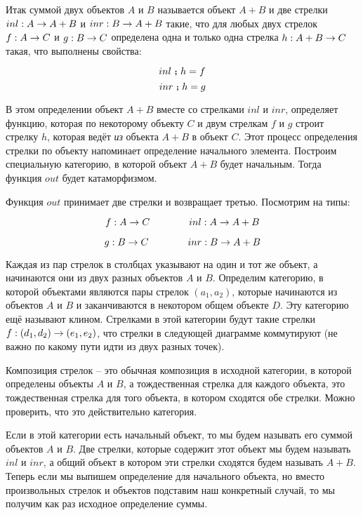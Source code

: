 \begin{centering}



\end{centering}

Итак суммой двух объектов $A$ и $B$ называется объект $A+B$ и две
стрелки $inl : A \rightarrow A+B$ и $inr : B \rightarrow A+B$ такие, что для любых двух
стрелок $f : A \rightarrow C$ и $g : B \rightarrow C$ определена одна и только одна
стрелка $h : A+B \rightarrow C$ такая, что выполнены свойства:

\[inl \footnotesize\textbf{~;~}\normalsize h = f\] \[inr \footnotesize\textbf{~;~}\normalsize h = g\]

В этом определении объект $A+B$ вместе со стрелками $inl$ и $inr$,
определяет функцию, которая по некоторому объекту $C$ и двум стрелкам
$f$ и $g$ строит стрелку $h$, которая ведёт \emph{из} объекта $A+B$ в
объект $C$. Этот процесс определения стрелки по объекту напоминает
определение начального элемента. Построим специальную категорию, в
которой объект $A+B$ будет начальным. Тогда функция $out$ будет
катаморфизмом.

Функция $out$ принимает две стрелки и возвращает третью. Посмотрим на
типы:

\[f : A \rightarrow C  \qquad\qquad inl : A \rightarrow A+B\]

\[g : B \rightarrow C  \qquad\qquad inr : B \rightarrow A+B\]

Каждая из пар стрелок в столбцах указывают на один и тот же объект, а
начинаются они из двух разных объектов $A$ и $B$. Определим категорию, в
которой объектами являются пары стрелок $(a_1, a_2)$, которые начинаются
из объектов $A$ и $B$ и заканчиваются в некотором общем объекте $D$. Эту
категорию ещё называют клином. Стрелками в этой категории будут такие
стрелки $f : (d_1, d_2) \rightarrow (e_1, e_2)$, что стрелки в следующей
диаграмме коммутируют (не важно по какому пути идти из двух разных
точек).

\begin{centering}



\end{centering}

Композиция стрелок -- это обычная композиция в исходной категории, в
которой определены объекты $A$ и $B$, а тождественная стрелка для
каждого объекта, это тождественная стрелка для того объекта, в котором
сходятся обе стрелки. Можно проверить, что это действительно категория.

Если в этой категории есть начальный объект, то мы будем называть его
суммой объектов $A$ и $B$. Две стрелки, которые содержит этот объект мы
будем называть $inl$ и $inr$, а общий объект в котором эти стрелки
сходятся будем называть $A+B$. Теперь если мы выпишем определение для
начального объекта, но вместо произвольных стрелок и объектов подставим
наш конкретный случай, то мы получим как раз исходное определение суммы.

